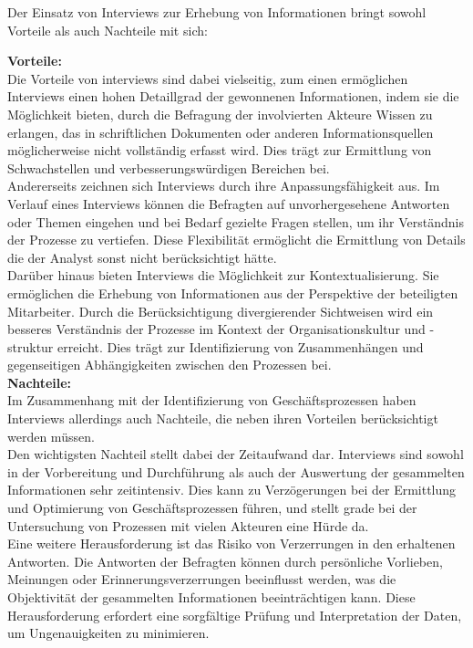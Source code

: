 Der Einsatz von Interviews zur Erhebung von Informationen bringt sowohl Vorteile als auch Nachteile mit sich:~\cite[Kapitel 5.2.2, 5.2.4]{Dumas2013}

\textbf{Vorteile:}\\
Die Vorteile von interviews sind dabei vielseitig, zum einen ermöglichen Interviews einen hohen Detaillgrad der gewonnenen Informationen, indem sie die Möglichkeit bieten, durch die Befragung der involvierten Akteure Wissen zu erlangen, das in schriftlichen Dokumenten oder anderen Informationsquellen möglicherweise nicht vollständig erfasst wird. Dies trägt zur Ermittlung von Schwachstellen und verbesserungswürdigen Bereichen bei.\\

Andererseits zeichnen sich Interviews durch ihre Anpassungsfähigkeit aus. Im Verlauf eines Interviews können die Befragten auf unvorhergesehene Antworten oder Themen eingehen und bei Bedarf gezielte Fragen stellen, um ihr Verständnis der Prozesse zu vertiefen. Diese Flexibilität ermöglicht die Ermittlung von Details die der Analyst sonst nicht berücksichtigt hätte.\\

Darüber hinaus bieten Interviews die Möglichkeit zur Kontextualisierung. Sie ermöglichen die Erhebung von Informationen aus der Perspektive der beteiligten Mitarbeiter. Durch die Berücksichtigung divergierender Sichtweisen wird ein besseres Verständnis der Prozesse im Kontext der Organisationskultur und -struktur erreicht. Dies trägt zur Identifizierung von Zusammenhängen und gegenseitigen Abhängigkeiten zwischen den Prozessen bei.\\

\textbf{Nachteile:}\\

Im Zusammenhang mit der Identifizierung von Geschäftsprozessen haben Interviews allerdings auch Nachteile, die neben ihren Vorteilen berücksichtigt werden müssen.\\

Den wichtigsten Nachteil stellt dabei der Zeitaufwand dar. Interviews sind sowohl in der Vorbereitung und Durchführung als auch der Auswertung der gesammelten Informationen sehr zeitintensiv. Dies kann zu Verzögerungen bei der Ermittlung und Optimierung von Geschäftsprozessen führen, und stellt grade bei der Untersuchung von Prozessen mit vielen Akteuren eine Hürde da.\\

Eine weitere Herausforderung ist das Risiko von Verzerrungen in den erhaltenen Antworten. Die Antworten der Befragten können durch persönliche Vorlieben, Meinungen oder Erinnerungsverzerrungen beeinflusst werden, was die Objektivität der gesammelten Informationen beeinträchtigen kann. Diese Herausforderung erfordert eine sorgfältige Prüfung und Interpretation der Daten, um Ungenauigkeiten zu minimieren.\\

